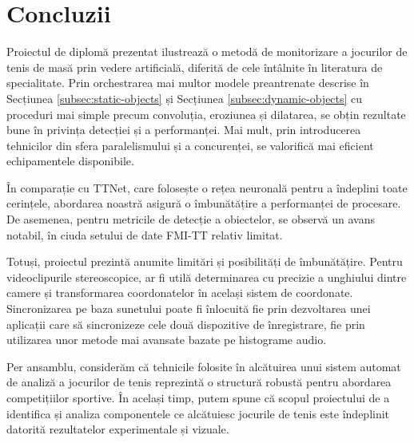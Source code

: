 \chapter{Concluzii}

Proiectul de diplomă prezentat ilustrează o metodă de monitorizare a jocurilor de tenis de masă prin vedere artificială, diferită de cele întâlnite în literatura de specialitate. Prin orchestrarea mai multor modele preantrenate descrise în Secțiunea \ref{subsec:static-objects} și Secțiunea \ref{subsec:dynamic-objects} cu proceduri mai simple precum convoluția, eroziunea și dilatarea, se obțin rezultate bune în privința detecției și a performanței. Mai mult, prin introducerea tehnicilor din sfera paralelismului și a concurenței, se valorifică mai eficient echipamentele disponibile.

În comparație cu TTNet, care folosește o rețea neuronală pentru a îndeplini toate cerințele, abordarea noastră asigură o îmbunătățire a performanței de procesare. De asemenea, pentru metricile de detecție a obiectelor, se observă un avans notabil, în ciuda setului de date FMI-TT relativ limitat.

Totuși, proiectul prezintă anumite limitări și posibilități de îmbunătățire. Pentru videoclipurile stereoscopice, ar fi utilă determinarea cu precizie a unghiului dintre camere și transformarea coordonatelor în același sistem de coordonate. Sincronizarea pe baza sunetului poate fi înlocuită fie prin dezvoltarea unei aplicații care să sincronizeze cele două dispozitive de înregistrare, fie prin utilizarea unor metode mai avansate bazate pe histograme audio.

Per ansamblu, considerăm că tehnicile folosite în alcătuirea unui sistem automat de analiză a jocurilor de tenis reprezintă o structură robustă pentru abordarea competițiilor sportive. În același timp, putem spune că scopul proiectului de a identifica și analiza componentele ce alcătuiesc jocurile de tenis este îndeplinit datorită rezultatelor experimentale și vizuale.